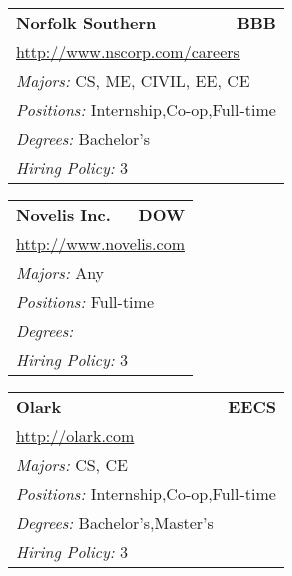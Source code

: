 \documentclass[twoside]{article}
\begin{document}
\begin{center}
\begin{multicols}{3}
\begin{FlushLeft}
\begin{minipage}{.9\columnwidth}
\end{minipage}
 
\begin{minipage}{.9\columnwidth}\begin{tabularx}{.95\columnwidth}{Xr}
                 {\Large\bf Norfolk Southern} & {\Large\bf BBB}\\
    \multicolumn{2}{p{.95\columnwidth}}{\url{http://www.nscorp.com/careers}}\\
    \multicolumn{2}{p{.95\columnwidth}}{\emph{Majors:} CS, ME, CIVIL, EE, CE}\\
    \multicolumn{2}{p{.95\columnwidth}}{\emph{Positions:} Internship,Co-op,Full-time}\\
    \multicolumn{2}{p{.95\columnwidth}}{\emph{Degrees:} Bachelor's}\\
    \multicolumn{2}{p{.95\columnwidth}}{\emph{Hiring Policy:} 3}\\
    \end{tabularx}
    
\end{minipage}
 
\begin{minipage}{.9\columnwidth}\begin{tabularx}{.95\columnwidth}{Xr}
                 {\Large\bf Novelis Inc.} & {\Large\bf DOW}\\
    \multicolumn{2}{p{.95\columnwidth}}{\url{http://www.novelis.com}}\\
    \multicolumn{2}{p{.95\columnwidth}}{\emph{Majors:} Any}\\
    \multicolumn{2}{p{.95\columnwidth}}{\emph{Positions:} Full-time}\\
    \multicolumn{2}{p{.95\columnwidth}}{\emph{Degrees:} }\\
    \multicolumn{2}{p{.95\columnwidth}}{\emph{Hiring Policy:} 3}\\
    \end{tabularx}
    
\end{minipage}
 
\begin{minipage}{.9\columnwidth}\begin{tabularx}{.95\columnwidth}{Xr}
                 {\Large\bf Olark} & {\Large\bf EECS}\\
    \multicolumn{2}{p{.95\columnwidth}}{\url{http://olark.com}}\\
    \multicolumn{2}{p{.95\columnwidth}}{\emph{Majors:} CS, CE}\\
    \multicolumn{2}{p{.95\columnwidth}}{\emph{Positions:} Internship,Co-op,Full-time}\\
    \multicolumn{2}{p{.95\columnwidth}}{\emph{Degrees:} Bachelor's,Master's}\\
    \multicolumn{2}{p{.95\columnwidth}}{\emph{Hiring Policy:} 3}\\
    \end{tabularx}
    

\end{minipage}
\end{FlushLeft}
\end{multicols}
\end{center}
\end{document}
